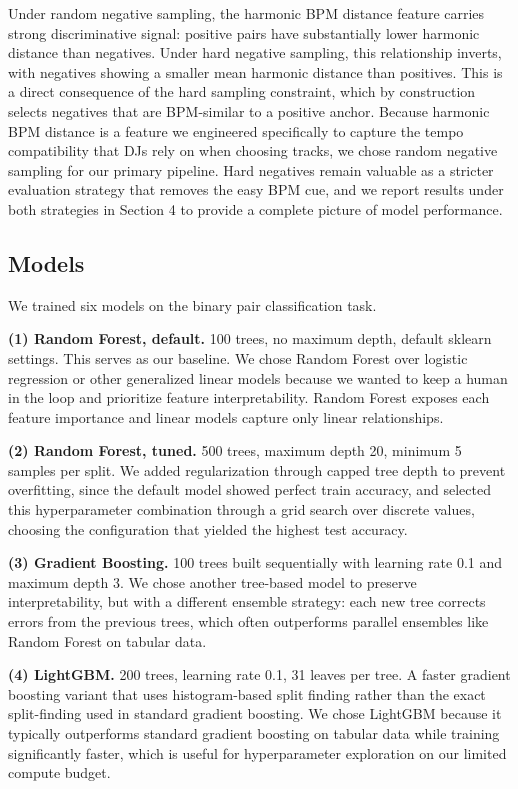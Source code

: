 \documentclass{article}
\begin{document}
Under random negative sampling, the harmonic BPM distance feature carries strong discriminative signal: positive pairs have substantially lower harmonic distance than negatives. Under hard negative sampling, this relationship inverts, with negatives showing a smaller mean harmonic distance than positives. This is a direct consequence of the hard sampling constraint, which by construction selects negatives that are BPM-similar to a positive anchor. Because harmonic BPM distance is a feature we engineered specifically to capture the tempo compatibility that DJs rely on when choosing tracks, we chose random negative sampling for our primary pipeline. Hard negatives remain valuable as a stricter evaluation strategy that removes the easy BPM cue, and we report results under both strategies in Section 4 to provide a complete picture of model performance.

\subsection{Models}

We trained six models on the binary pair classification task.

\noindent\textbf{(1) Random Forest, default.} 100 trees, no maximum depth, default sklearn settings. This serves as our baseline. We chose Random Forest over logistic regression or other generalized linear models because we wanted to keep a human in the loop and prioritize feature interpretability. Random Forest exposes each feature importance and linear models capture only linear relationships.

\noindent\textbf{(2) Random Forest, tuned.} 500 trees, maximum depth 20, minimum 5 samples per split. We added regularization through capped tree depth to prevent overfitting, since the default model showed perfect train accuracy, and selected this hyperparameter combination through a grid search over discrete values, choosing the configuration that yielded the highest test accuracy.

\noindent\textbf{(3) Gradient Boosting.} 100 trees built sequentially with learning rate 0.1 and maximum depth 3. We chose another tree-based model to preserve interpretability, but with a different ensemble strategy: each new tree corrects errors from the previous trees, which often outperforms parallel ensembles like Random Forest on tabular data.

\noindent\textbf{(4) LightGBM.} 200 trees, learning rate 0.1, 31 leaves per tree. A faster gradient boosting variant that uses histogram-based split finding rather than the exact split-finding used in standard gradient boosting. We chose LightGBM because it typically outperforms standard gradient boosting on tabular data while training significantly faster, which is useful for hyperparameter exploration on our limited compute budget.
\end{document}
